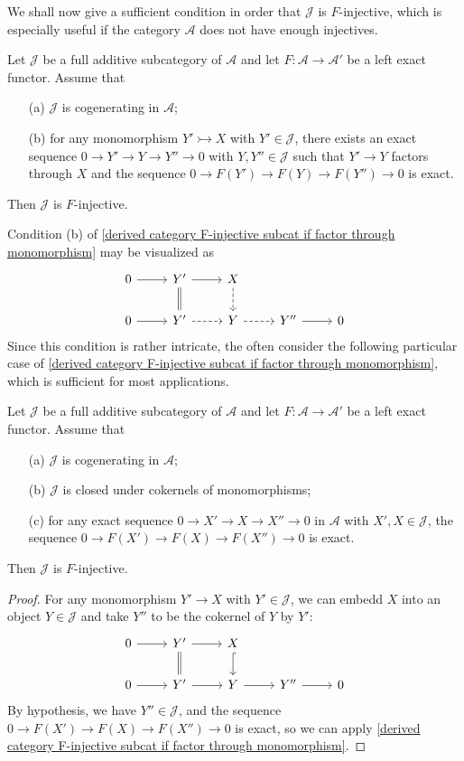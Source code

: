 We shall now give a sufficient condition in order that $\mathcal{J}$ is $F$-injective, which is especially useful if the category $\mathcal{A}$ does not have enough injectives.

\begin{theorem}\label{derived category F-injective subcat if factor through monomorphism}
Let $\mathcal{J}$ be a full additive subcategory of $\mathcal{A}$ and let $F:\mathcal{A}\to\mathcal{A}'$ be a left exact functor. Assume that
\begin{enumerate}
    \item[(a)] $\mathcal{J}$ is cogenerating in $\mathcal{A}$;
    \item[(b)] for any monomorphism $Y'\rightarrowtail X$ with $Y'\in\mathcal{J}$, there exists an exact sequence $0\to Y'\to Y\to Y''\to 0$ with $Y,Y''\in\mathcal{J}$ such that $Y'\to Y$ factors through $X$ and the sequence $0\to F(Y')\to F(Y)\to F(Y'')\to 0$ is exact. 
\end{enumerate}
Then $\mathcal{J}$ is $F$-injective.
\end{theorem}
Condition (b) of \cref{derived category F-injective subcat if factor through monomorphism} may be visualized as
\[\begin{tikzcd}
0\ar[r]&Y'\ar[d,equal]\ar[r]&X\ar[d,dashed]\\
0\ar[r]&Y'\ar[r,dashed]&Y\ar[r,dashed]&Y''\ar[r]&0
\end{tikzcd}\]
Since this condition is rather intricate, the often consider the following particular case of \cref{derived category F-injective subcat if factor through monomorphism}, which is sufficient for most applications.
\begin{corollary}\label{derived category F-injective subcat if exact on cokernel of monomorphism}
Let $\mathcal{J}$ be a full additive subcategory of $\mathcal{A}$ and let $F:\mathcal{A}\to\mathcal{A}'$ be a left exact functor. Assume that
\begin{enumerate}
    \item[(a)] $\mathcal{J}$ is cogenerating in $\mathcal{A}$;
    \item[(b)] $\mathcal{J}$ is closed under cokernels of monomorphisms;
    \item[(c)] for any exact sequence $0\to X'\to X\to X''\to 0$ in $\mathcal{A}$ with $X',X\in\mathcal{J}$, the sequence $0\to F(X')\to F(X)\to F(X'')\to 0$ is exact.
\end{enumerate}
Then $\mathcal{J}$ is $F$-injective.
\end{corollary}
\begin{proof}
For any monomorphism $Y'\to X$ with $Y'\in\mathcal{J}$, we can embedd $X$ into an object $Y\in\mathcal{J}$ and take $Y''$ to be the cokernel of $Y$ by $Y'$:
\[\begin{tikzcd}
0\ar[r]&Y'\ar[d,equal]\ar[r]&X\ar[d,hook]\\
0\ar[r]&Y'\ar[r]&Y\ar[r]&Y''\ar[r]&0
\end{tikzcd}\]
By hypothesis, we have $Y''\in\mathcal{J}$, and the sequence $0\to F(X')\to F(X)\to F(X'')\to 0$ is exact, so we can apply \cref{derived category F-injective subcat if factor through monomorphism}.
\end{proof}
